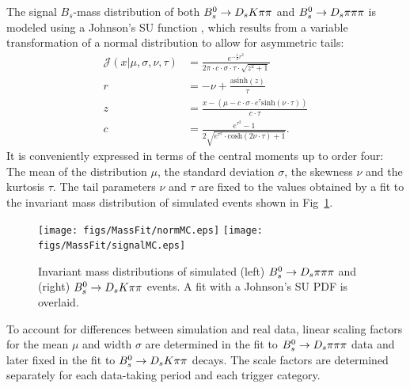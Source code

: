 The signal $B_s$-mass distribution of both ${{B}^0_{s}}\rightarrow{\ensuremath{{D}_{s}}}{\ensuremath{K}}{\ensuremath{\pi}}{\ensuremath{\pi}}$ and ${{B}^0_{s}}\rightarrow{\ensuremath{{D}_{s}}}{\ensuremath{\pi}}{\ensuremath{\pi}}{\ensuremath{\pi}}$  is modeled using a Johnson's SU function \cite{10.2307/2332539}, which 
results from a variable transformation of a normal distribution to allow for asymmetric tails:
\begin{align}
\mathcal J(x\vert\mu,\sigma,\nu,\tau) &=
\frac{e^{- \frac{1}{2} r^2}}{2\pi \cdot c \cdot \sigma \cdot \tau \cdot \sqrt{z^2+1}} \\
r &= - \nu + \frac{\text{asinh}(z)}{\tau} \\
z & = \frac{x-(\mu - c \cdot \sigma \cdot e^\tau \text{sinh}(\nu\cdot \tau))}{c \cdot \tau} \\
c &= \frac{e^{\tau^2}-1}{2\sqrt{e^{\tau^2} \cdot \text{cosh}(2 \nu \cdot \tau)+1}} .
\label{eq:RooJohnsonSU}
\end{align}
It is conveniently expressed in terms of the central moments up to order four: 
The mean of the distribution $\mu$, the standard deviation $\sigma$,
the skewness $\nu$ and the kurtosis $\tau$.
The tail parameters $\nu$ and $\tau$ are fixed to the values obtained by a fit to the invariant mass distribution of simulated events shown in Fig~\ref{fig: BsMassShapes}. 
\begin{figure}[b]
\centering
\texttt{[image: figs/MassFit/normMC.eps]} 
\texttt{[image: figs/MassFit/signalMC.eps]}
\caption{Invariant mass distributions of simulated (left) ${{B}^0_{s}}\rightarrow{\ensuremath{{D}_{s}}}{\ensuremath{\pi}}{\ensuremath{\pi}}{\ensuremath{\pi}}$ and (right) ${{B}^0_{s}}\rightarrow{\ensuremath{{D}_{s}}}{\ensuremath{K}}{\ensuremath{\pi}}{\ensuremath{\pi}}$ events. A fit with a Johnson's SU PDF is overlaid.}
\label{fig: BsMassShapes}
\end{figure}
To account for differences between simulation and real data, linear scaling factors for the mean $\mu$ and width $\sigma$ are determined in the fit to ${{B}^0_{s}}\rightarrow{\ensuremath{{D}_{s}}}{\ensuremath{\pi}}{\ensuremath{\pi}}{\ensuremath{\pi}}$ data  
and later fixed in the fit to ${{B}^0_{s}}\rightarrow{\ensuremath{{D}_{s}}}{\ensuremath{K}}{\ensuremath{\pi}}{\ensuremath{\pi}}$ decays. 
The scale factors are determined separately for each data-taking period and each trigger category.


